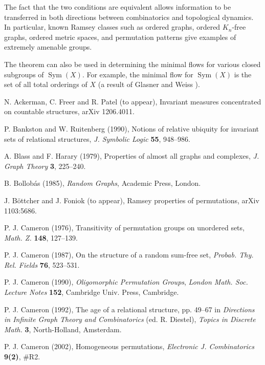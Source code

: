 \documentclass{book}
\DeclareMathOperator{\Sym}{Sym}
\begin{document}
The fact that the two conditions are equivalent allows information to be
transferred in both directions between combinatorics and topological dynamics.
In particular, known Ramsey classes such as ordered graphs, ordered $K_n$-free
graphs, ordered metric spaces, and permutation patterns give examples of
extremely amenable groups.

The theorem can also be used in determining the minimal flows for various
closed subgroups of $\Sym(X)$. For example, the minimal flow for $\Sym(X)$ is
the set of all total orderings of $X$ (a result of Glasner and Weiss
\cite{ch32:new8}).

\begin{thebibliography}{99}

N. Ackerman, C. Freer and R. Patel (to appear),
Invariant measures concentrated on countable structures,
arXiv 1206.4011.

P. Bankston and W. Ruitenberg (1990),
Notions of relative ubiquity for invariant sets of relational structures,
\textit{J. Symbolic Logic} \textbf{55}, 948--986.

A. Blass and F. Harary (1979),
Properties of almost all graphs and complexes,
\textit{J. Graph Theory} \textbf{3}, 225--240.

B. Bollob\'{a}s (1985),
\textit{Random Graphs}, Academic Press, London.

J. B\"ottcher and J. Foniok (to appear),
Ramsey properties of permutations,
arXiv 1103:5686.

P. J. Cameron (1976),
Transitivity of permutation groups on unordered sets,
\textit{Math. Z.} \textbf{148}, 127--139.

P. J. Cameron (1987),
On the structure of a random sum-free set,
\textit{Probab. Thy. Rel. Fields} \textbf{76}, 523--531.

P. J. Cameron (1990),
\textit{Oligomorphic Permutation Groups},
\textit{London Math. Soc. Lecture Notes} \textbf{152},
Cambridge Univ. Press, Cambridge.

 P. J. Cameron (1992), The age of a relational structure, pp. 49--67 in \textit{Directions
in Infinite Graph Theory and Combinatorics} (ed. R. Diestel),
\textit{Topics in Discrete Math.} \textbf{3}, North-Holland,
Amsterdam.

P. J. Cameron (2002),
Homogeneous permutations,
\textit{Electronic J. Combinatorics} \textbf{9(2)}, \#R2.


\end{thebibliography}
\end{document}
